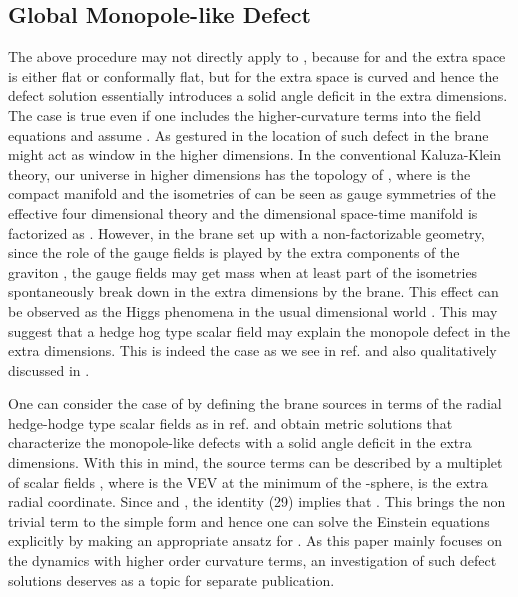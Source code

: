 \documentclass[a4paper,12pt]{article}
\begin{document}
\subsection{Global Monopole-like Defect}
The above procedure may not directly apply to \coordHE{}, because for \coordHE{} 
and \coordHE{} the extra space is either flat or conformally flat, but for \coordHE{} the extra space is curved and hence the defect solution essentially 
introduces a solid angle deficit in the extra dimensions. The case is true 
even if one includes the higher-curvature terms 
into the field equations and assume \coordHE{}. As gestured in 
\cite{DVA} the location of such defect in the brane might act as window 
in the higher dimensions. In the conventional Kaluza-Klein theory, our 
universe in higher dimensions has the topology of \coordHE{}, where \coordHE{} 
is the compact manifold and the isometries of \coordHE{} can be seen as gauge 
symmetries of the effective four dimensional theory \cite{YMC} and
the \coordHE{} dimensional space-time manifold is factorized as \coordHE{}.
However, in the brane set up with a non-factorizable geometry, since the role 
of the gauge fields is played by the extra components of the graviton 
\cite{NAH}, the gauge fields may get mass when at least part of 
the \coordHE{} isometries spontaneously break down in the extra dimensions by 
the brane. This effect can be observed as the Higgs phenomena 
in the usual \coordHE{} dimensional world \cite{DVA}. This may suggest that a 
hedge hog type scalar field may explain the monopole defect in 
the extra dimensions. This is indeed the case as we see in ref.\cite{IAV} 
and also qualitatively discussed in \cite{DVA}.

One can consider the case of \coordHE{} by defining the brane 
sources in terms of the radial hedge-hodge type scalar fields as in 
ref.\cite{IAV} and obtain metric solutions that characterize the monopole-like 
defects with a solid angle deficit in the extra dimensions. 
With this in mind, the source terms can be described by a multiplet of 
\coordHE{} scalar fields \coordHE{}, 
where \myHighlight{$\upsilon$}\coordHE{} is the VEV at the minimum of the \coordHE{}-sphere, \coordHE{} is the 
extra radial coordinate. Since \coordHE{} 
and \coordHE{}, the identity (29) 
implies that \coordHE{}. This brings the non trivial term \coordHE{} to the 
simple form and hence one can solve the Einstein equations explicitly by 
making an appropriate ansatz for \coordHE{}. As this paper mainly focuses on 
the dynamics with higher order curvature terms, an investigation of such 
defect solutions deserves as a topic for separate publication.
\nopagebreak 
\end{document}
